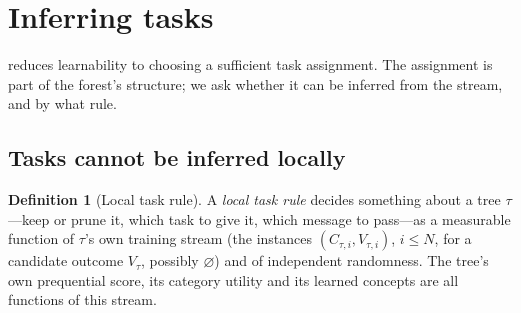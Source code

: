 \documentclass[11pt]{article}
\theoremstyle{definition}
\newtheorem{definition}[theorem]{Definition}
\theoremstyle{remark}
\begin{document}
\section{Inferring tasks}\label{sec:infer}

 reduces learnability to choosing a sufficient task assignment.  The
assignment is part of the forest's structure; we ask whether it can be inferred from the
stream, and by what rule.

\subsection{Tasks cannot be inferred locally}

\begin{definition}[Local task rule]\label{def:local}
A \emph{local task rule} decides something about a tree $\tau$---keep or prune it,
which task to give it, which message to pass---as a measurable function of $\tau$'s own
training stream (the instances $(C_{\tau,i},V_{\tau,i})$, $i\le N$, for a candidate
outcome $V_\tau$, possibly $\varnothing$) and of independent randomness.  The tree's own
prequential score, its category utility and its learned concepts are all functions of
this stream.
\end{definition}
\end{document}
